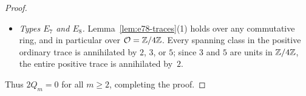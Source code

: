 \begin{proof}
\begin{itemize}
\item \emph{Types $E_7$ and $E_8$.} Lemma~\ref{lem:e78-traces}(1) holds over any commutative ring, and in particular over $\mathcal O=\mathbb Z/4\mathbb Z$. Every spanning class in the positive ordinary trace is annihilated by $2$, $3$, or $5$; since $3$ and $5$ are units in $\mathbb Z/4\mathbb Z$, the entire positive trace is annihilated by~$2$.
\end{itemize}
Thus $2Q_m=0$ for all $m\geq2$, completing the proof.
\end{proof}
